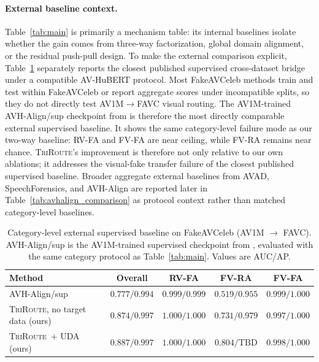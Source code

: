 \documentclass{article}
\newcommand{\method}{\textsc{TriRoute}}
\begin{document}
\paragraph{External baseline context.}
Table~\ref{tab:main} is primarily a mechanism table: its internal baselines isolate whether the gain comes from three-way factorization, global domain alignment, or the residual push-pull design. To make the external comparison explicit, Table~\ref{tab:external_category} separately reports the closest published supervised cross-dataset bridge under a compatible AV-HuBERT protocol. Most FakeAVCeleb methods train and test within FakeAVCeleb or report aggregate scores under incompatible splits, so they do not directly test AV1M$\rightarrow$FAVC visual routing. The AV1M-trained AVH-Align/sup checkpoint from \citet{smeu2025avhalign} is therefore the most directly comparable external supervised baseline. It shows the same category-level failure mode as our two-way baseline: RV-FA and FV-FA are near ceiling, while FV-RA remains near chance. \method's improvement is therefore not only relative to our own ablations; it addresses the visual-fake transfer failure of the closest published supervised baseline. Broader aggregate external baselines from AVAD, SpeechForensics, and AVH-Align are reported later in Table~\ref{tab:avhalign_comparison} as protocol context rather than matched category-level baselines.

\begin{table}[t]
    \centering
    \caption{Category-level external supervised baseline on FakeAVCeleb (AV1M $\to$ FAVC). AVH-Align/sup is the AV1M-trained supervised checkpoint from \citet{smeu2025avhalign}, evaluated with the same category protocol as Table~\ref{tab:main}. Values are AUC/AP.}
    \label{tab:external_category}
    \small
    \begin{tabular}{lcccc}
        \toprule
        Method & Overall & RV-FA & FV-RA & FV-FA \\
        \midrule
        AVH-Align/sup \citep{smeu2025avhalign} & $0.777/0.994$ & $0.999/0.999$ & $0.519/0.955$ & $0.999/1.000$ \\
        \method, no target data (ours) & $0.874/0.997$ & $1.000/1.000$ & $0.731/0.979$ & $0.997/1.000$ \\
        \method\ + UDA (ours) & $\mathbf{0.887/0.997}$ & $1.000/1.000$ & $\mathbf{0.804/\mathrm{TBD}}$ & $0.998/1.000$ \\
        \bottomrule
    \end{tabular}
\end{table}
\end{document}
